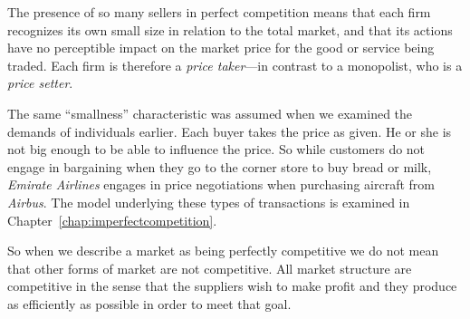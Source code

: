 The presence of so many sellers in perfect competition means that each firm recognizes its own small size in relation to the total market, and that its actions have no perceptible impact on the market price for the good or service being traded. Each firm is therefore a \textit{price taker}---in contrast to a monopolist, who is a \textit{price setter}. 

The same ``smallness'' characteristic was assumed when we examined the demands of individuals earlier. Each buyer takes the price as given. He or she is not big enough to be able to influence the price. So while customers do not engage in bargaining when they go to the corner store to buy bread or milk, \textit{Emirate Airlines} engages in price negotiations when purchasing aircraft from \textit{Airbus}. The model underlying these types of transactions is examined in Chapter~\ref{chap:imperfectcompetition}. 

So when we describe a market as being perfectly competitive we do not mean that other forms of market are not competitive. All market structure are competitive in the sense that the suppliers wish to make profit and they produce as efficiently as possible in order to meet that goal.